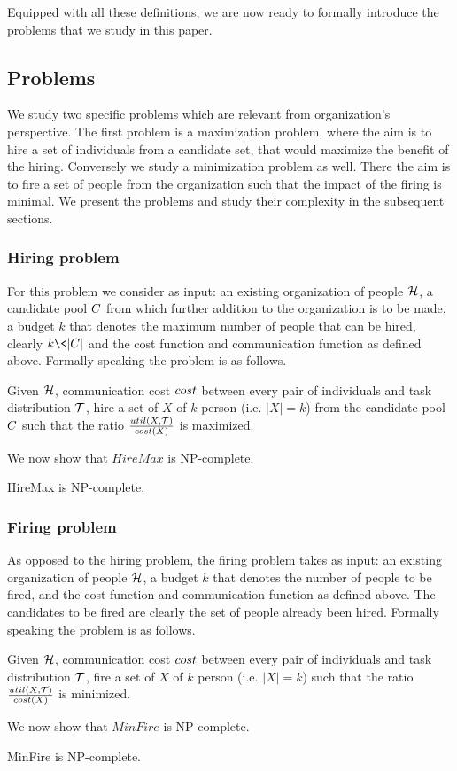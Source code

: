 Equipped with all these definitions, we are now ready to formally introduce the problems that we study in this paper.

\subsection{Problems}

We study two specific problems which are relevant from organization's perspective. The first problem is a maximization problem, where the aim is to hire a set of individuals from a candidate set, that would maximize the benefit of the hiring. Conversely we study a minimization problem as well. There the aim is to fire a set of people from the organization such that the impact of the firing is minimal. We present the problems and study their complexity in the subsequent sections.

\subsubsection{Hiring problem}

For this problem we consider as input: an existing organization of people $\mathcal{H}$, a candidate pool ${C}$ from which further addition to the organization is to be made, a budget $k$ that denotes the maximum number of people that can be hired, clearly $k \< |\candidates|$ and the cost function and communication function as defined above. Formally speaking the problem is as follows.  
\begin{problem}
[HireMax] Given $\mathcal{H}$, communication cost $cost$ between every pair of individuals and task distribution $\mathcal{T}$, hire a set of $X$ of $k$ person (i.e. $|X| = k$) from the candidate pool ${C}$ such that the ratio $\frac{util(X, \mathcal{T})}{cost(X)}$ is maximized.
\end{problem}

We now show that $HireMax$ is NP-complete.
\begin{theorem}
HireMax is NP-complete.
\end{theorem}



\subsubsection{Firing problem}

As opposed to the hiring problem, the firing problem takes as input: an existing organization of people $\mathcal{H}$, a budget $k$ that denotes the number of people to be fired, and the cost function and communication function as defined above. The candidates to be fired are clearly the set of people already been hired. Formally speaking the problem is as follows.  
\begin{problem}
[MinFire] Given $\mathcal{H}$, communication cost $cost$ between every pair of individuals and task distribution $\mathcal{T}$, fire a set of $X$ of $k$ person (i.e. $|X| = k$) such that the ratio $\frac{util(X, \mathcal{T})}{cost(X)}$ is minimized.
\end{problem}

We now show that $MinFire$ is NP-complete.
\begin{theorem}
MinFire is NP-complete.
\end{theorem}

